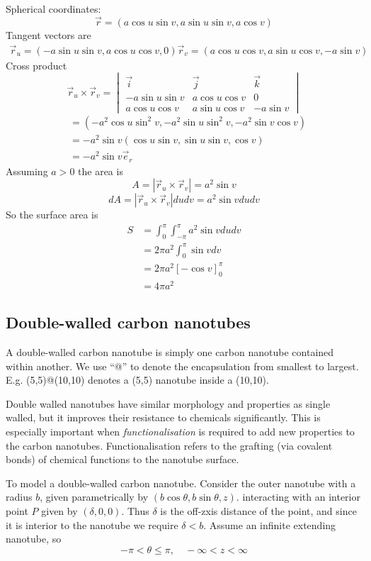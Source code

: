 \documentclass{X:/Documents/Coding/Latex/myassignment}
\begin{document}
Spherical coordinates:
\[\vec r = (a\cos u\sin v, a\sin u \sin v, a \cos v)\]
Tangent vectors are
\begin{align*}
	\vec r_u = (-a\sin u \sin v, a\cos u \cos v, 0) 
	\vec r_v = (a\cos u \cos v, a\sin u \cos v, -a\sin v)
\end{align*}
Cross product
\[\vec r_u \times \vec r_v = \begin{vmatrix}
	\vec i&\vec j&\vec k\\
	-a\sin u \sin v& a\cos u \cos v& 0\\
	a\cos u \cos v& a\sin u \cos v& -a\sin v
\end{vmatrix} \]
\begin{align*}
	&= (-a^2\cos u \sin^2 v, -a^2 \sin u \sin^2 v, -a^2 \sin v \cos v)\\
	&=  -a^2\sin v(\cos u \sin v, \sin u \sin v, \cos v)\\
	&= -a^2\sin v \vec e_r
\end{align*}
Assuming $a > 0$ the area is
\[A = |\vec r_u \times \vec r_v| = a^2\sin v\]
\[dA = |\vec r_u \times \vec r_v |dudv  = a^2 \sin v du dv \]
So the surface area is
\begin{align*}
	S&= \int_0^\pi \int_{-\pi}^{\pi} a^2\sin v du dv\\
	&= 2\pi a^2 \int_0^\pi \sin v dv\\
	&= 2\pi a^2 [-\cos v]_0^\pi\\
	&= 4\pi a^2
\end{align*}


\subsection{Double-walled carbon nanotubes}
A double-walled carbon nanotube is simply one carbon nanotube contained within another.
We use ``@'' to denote the encapsulation from smallest to largest. E.g. (5,5)@(10,10) denotes a (5,5) nanotube inside a (10,10).

Double walled nanotubes have similar morphology and properties as single walled, but it improves their resistance to chemicals significantly. This is especially important when \textit{functionalisation} is required to add new properties to the carbon nanotubes.
Functionalisation refers to the grafting (via covalent bonds) of chemical functions to the nanotube surface.


To model a double-walled carbon nanotube. Consider the outer nanotube with a radius $b$, given parametrically by $(b\cos \theta, b\sin \theta, z)$. interacting with an interior point $P$ given by $(\delta,0,0)$. Thus $\delta$ is the off-zxis distance of the point, and since it is interior to the nanotube we require $\delta <b$. Assume an infinite extending nanotube, so
\[-\pi < \theta \leq \pi, \quad -\infty < z < \infty\]
\end{document}
